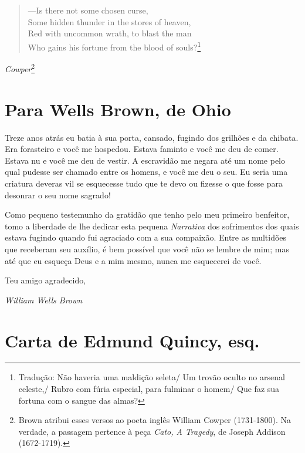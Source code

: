 \chapter*{}
\thispagestyle{empty}
\begin{verse}
---Is there not some chosen curse,\\
Some hidden thunder in the stores of heaven,\\
Red with uncommon wrath, to blast the man\\
Who gains his fortune from the blood of \qb{}souls?\footnote{Tradução: Não haveria uma maldição seleta/ Um trovão oculto no arsenal celeste,/ Rubro com fúria especial, para fulminar o homem/ Que faz sua fortuna com o sangue das almas?}
\end{verse}
\begin{flushright}
\emph{Cowper}\footnote{Brown atribui esses versos ao poeta inglês William
  Cowper (1731-1800). Na verdade, a passagem pertence à peça \emph{Cato,
  A Tragedy}, de Joseph Addison (1672-1719).}
\end{flushright}

\chapter{Para Wells Brown, de Ohio}

Treze anos atrás eu batia à sua porta, cansado, fugindo dos grilhões e
da chibata. Era forasteiro e você me hospedou. Estava faminto e você me
deu de comer. Estava nu e você me deu de vestir. A escravidão me negara
até um nome pelo qual pudesse ser chamado entre os homens, e você me deu
o seu. Eu seria uma criatura deveras vil se esquecesse tudo que te devo 
ou fizesse o que fosse para desonrar o seu nome sagrado!

Como pequeno testemunho da gratidão que tenho pelo meu primeiro
benfeitor, tomo a liberdade de lhe dedicar esta pequena \emph{Narrativa} dos
sofrimentos dos quais estava fugindo quando fui agraciado com a sua
compaixão. Entre as multidões que receberam seu auxílio, é bem possível
que você não se lembre de mim; mas até que eu esqueça Deus e a mim
mesmo, nunca me esquecerei de você.

Teu amigo agradecido,

\begin{flushright}
\emph{William Wells Brown}
\end{flushright}

\chapter{Carta de Edmund Quincy, esq.}

